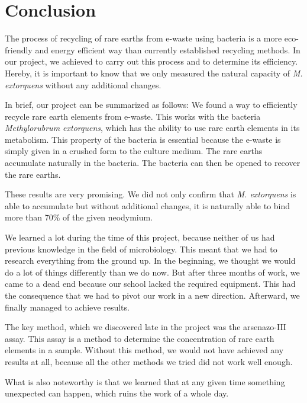 \chapter{Conclusion\authorA{}}
The process of recycling of rare earths from e-waste using bacteria is a more eco-friendly and energy efficient way than currently established recycling methods.
In our project, we achieved to carry out this process and to determine its efficiency.
Hereby, it is important to know that we only measured the natural capacity of \emph{M. extorquens} without any additional changes.

In brief, our project can be summarized as follows:
We found a way to efficiently recycle rare earth elements from e-waste.
This works with the bacteria \emph{Methylorubrum extorquens}, which has the ability to use rare earth elements in its metabolism.
This property of the bacteria is essential because the e-waste is simply given in a crushed form to the culture medium.
The rare earths accumulate naturally in the bacteria.
The bacteria can then be opened to recover the rare earths.

These results are very promising.
We did not only confirm that \emph{M. extorquens} is able to accumulate  but without additional changes, it is naturally able to bind more than 70\% of the given neodymium.

We learned a lot during the time of this project, because neither of us had previous knowledge in the field of microbiology.
This meant that we had to research everything from the ground up.
In the beginning, we thought we would do a lot of things differently than we do now.
But after three months of work, we came to a dead end because our school lacked the required equipment.
This had the consequence that we had to pivot our work in a new direction.
Afterward, we finally managed to achieve results.

The key method, which we discovered late in the project was the arsenazo-III assay.
This assay is a method to determine the concentration of rare earth elements in a sample.
Without this method, we would not have achieved any results at all, because all the other methods we tried did not work well enough.

What is also noteworthy is that we learned that at any given time something unexpected can happen, which ruins the work of a whole day.
